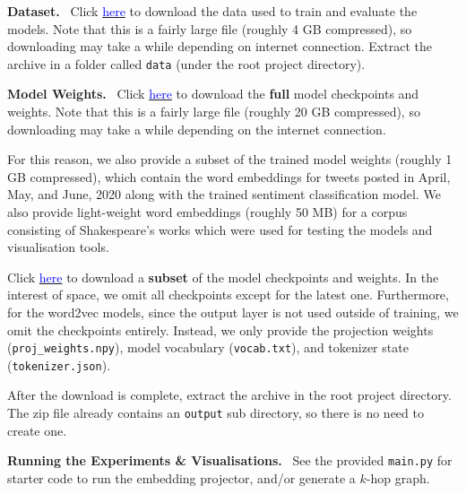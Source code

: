 \documentclass{paper}
\newcommand{\inlineSection}[1]{\vspace{0.5em}\noindent\textbf{#1.}~}
\begin{document}
\inlineSection{Dataset} Click \hyperlink{https://drive.google.com/file/d/16TWeFHXcywSoc13vrsw9SxEZ4lJndp4g/view?usp=sharing}{\textcolor{blue}{here}} to download the data used to train and evaluate the models. Note that this is a fairly large file (roughly 4 GB compressed), so downloading may take a while depending on internet connection. Extract the archive in a folder called \texttt{data} (under the root project directory).

\inlineSection{Model Weights} Click \hyperlink{https://mega.nz/file/b0EViYzT\#MEgk2yE5M3fjYUimtyhAj6XzZK5lZr7G29bPGN1rc20}{\textcolor{blue}{here}} to download the \textbf{full} model checkpoints and weights. Note that this is a fairly large file (roughly 20 GB compressed), so downloading may take a while depending on the internet connection.

For this reason, we also provide a subset of the trained model weights (roughly 1 GB compressed), which contain the word embeddings for tweets posted in April, May, and June, 2020 along with the trained sentiment classification model. We also provide light-weight word embeddings (roughly 50 MB) for a corpus consisting of Shakespeare's works which were used for testing the models and visualisation tools.

Click \hyperlink{https://mega.nz/file/28FQmbZY\#nHoAVB3AL0OdyyP58KVLjMG6GTm5eLt77EgyF60xOn4}{\textcolor{blue}{here}} to download a \textbf{subset} of the model checkpoints and weights. In the interest of space, we omit all checkpoints except for the latest one. Furthermore, for the word2vec models, since the output layer is not used outside of training, we omit the checkpoints entirely. Instead, we only provide the projection weights (\texttt{proj\_weights.npy}), model vocabulary (\texttt{vocab.txt}), and tokenizer state (\texttt{tokenizer.json}).

After the download is complete, extract the archive in the root project directory. The zip file already contains an \texttt{output} sub directory, so there is no need to create one.

\inlineSection{Running the Experiments \& Visualisations} See the provided \texttt{main.py} for starter code to run the embedding projector, and/or generate a $k$-hop graph.
\end{document}
